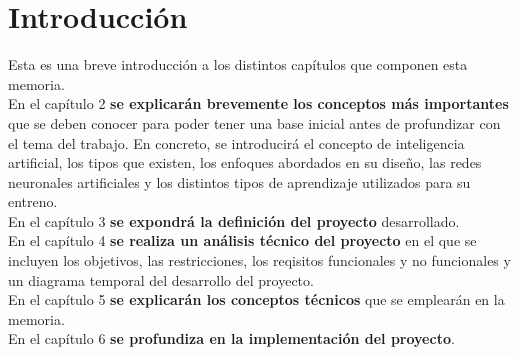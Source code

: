 
\chapter{Introducción}\label{introduccion}

Esta es una breve introducción a los distintos capítulos que componen esta memoria. \\

En el capítulo 2 \textbf{se explicarán brevemente los conceptos más importantes} que se deben conocer para poder tener una base inicial antes de profundizar con el tema del trabajo. En concreto, se introducirá el concepto de inteligencia artificial, los tipos que existen, los enfoques abordados en su diseño, las redes neuronales artificiales y los distintos tipos de aprendizaje utilizados para su entreno. \\

En el capítulo 3 \textbf{se expondrá la definición del proyecto} desarrollado. \\

En el capítulo 4 \textbf{se realiza un análisis técnico del proyecto} en el que se incluyen los objetivos, las restricciones, los reqisitos funcionales y no funcionales y un diagrama temporal del desarrollo del proyecto. \\

En el capítulo 5 \textbf{se explicarán los conceptos técnicos} que se emplearán en la memoria. \\

En el capítulo 6 \textbf{se profundiza en la implementación del proyecto}. \\